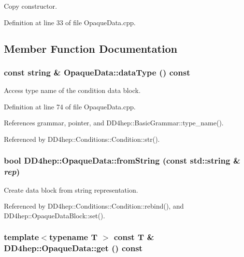 Copy constructor. 

Definition at line 33 of file OpaqueData.cpp.

\subsection{Member Function Documentation}
\hypertarget{class_d_d4hep_1_1_opaque_data_ac6eab785c37e098f09b1861e00a9e919}{
\subsubsection[{dataType}]{\setlength{\rightskip}{0pt plus 5cm}const {\bf string} \& OpaqueData::dataType () const}}
\label{class_d_d4hep_1_1_opaque_data_ac6eab785c37e098f09b1861e00a9e919}


Access type name of the condition data block. 

Definition at line 74 of file OpaqueData.cpp.

References grammar, pointer, and DD4hep::BasicGrammar::type\_\-name().

Referenced by DD4hep::Conditions::Condition::str().\hypertarget{class_d_d4hep_1_1_opaque_data_a356cc2bf1722ae6738c584730046ce5a}{
\subsubsection[{fromString}]{\setlength{\rightskip}{0pt plus 5cm}bool DD4hep::OpaqueData::fromString (const std::string \& {\em rep})}}
\label{class_d_d4hep_1_1_opaque_data_a356cc2bf1722ae6738c584730046ce5a}


Create data block from string representation. 

Referenced by DD4hep::Conditions::Condition::rebind(), and DD4hep::OpaqueDataBlock::set().\hypertarget{class_d_d4hep_1_1_opaque_data_a1f0b1e15c715366ae8b0d9fb0e971880}{
\subsubsection[{get}]{\setlength{\rightskip}{0pt plus 5cm}template$<$typename T $>$ const {\bf T} \& DD4hep::OpaqueData::get () const}}
\label{class_d_d4hep_1_1_opaque_data_a1f0b1e15c715366ae8b0d9fb0e971880}


